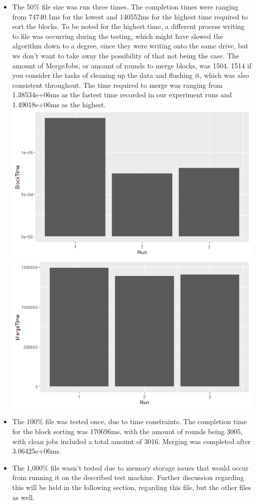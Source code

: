 \documentclass[twocolumn]{article}
\begin{document}
\begin{itemize}
	\item The 50\% file size was run three times. The completion times were ranging from 74740.1ms for the lowest and 140552ms for the highest time required to sort the blocks. To be noted for the highest time, a different process writing to file was occurring during the testing, which might have slowed the algorithm down to a degree, since they were writing onto the same drive, but we don't want to take away the possibility of that not being the case. The amount of MergeJobs, or amount of rounds to merge blocks, was 1504. 1514 if you consider the tasks of cleaning up the data and flushing it, which was also consistent throughout. The time required to merge was ranging from 1.38534e+06ms as the fastest time recorded in our experiment runs and 1.49018e+06ms as the highest.\\
	\includegraphics[scale=0.33]{./graph/Perc50_Block.png}
	\includegraphics[scale=0.33]{./graph/Perc50_Merge.png}
	\item The 100\% file was tested once, due to time constraints. The completion time for the block sorting was 170696ms, with the amount of rounds being 3005, with clean jobs included a total amount of 3016. Merging was completed after 3.06425e+06ms.
	\item The 1,000\% file wasn't tested due to memory storage issues that would occur from running it on the described test machine. Further discussion regarding this will be held in the following section, regarding this file, but the other files as well.
\end{itemize}
\newpage
\end{document}
